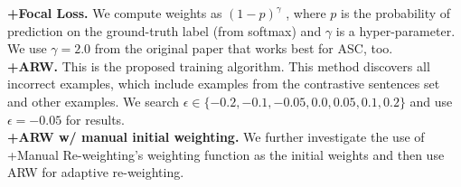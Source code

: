 \textbf{+Focal Loss.} We compute weights as $(1-p)^\gamma$ \cite{lin2017focal}, where $p$ is the probability of prediction on the ground-truth label (from softmax) and $\gamma$ is a hyper-parameter. We use $\gamma = 2.0 $ from the original paper that works best for ASC, too.\\ %
\textbf{+ARW.} This is the proposed training algorithm. This method discovers all incorrect examples, which include examples from the contrastive sentences set and other examples. We search $\epsilon \in \{-0.2, -0.1, -0.05, 0.0, 0.05, 0.1, 0.2\}$ and use $\epsilon = -0.05 $ for results.\\
\textbf{+ARW w/ manual initial weighting.} We further investigate the use of +Manual Re-weighting's weighting function as the initial weights and then use ARW for adaptive re-weighting.


